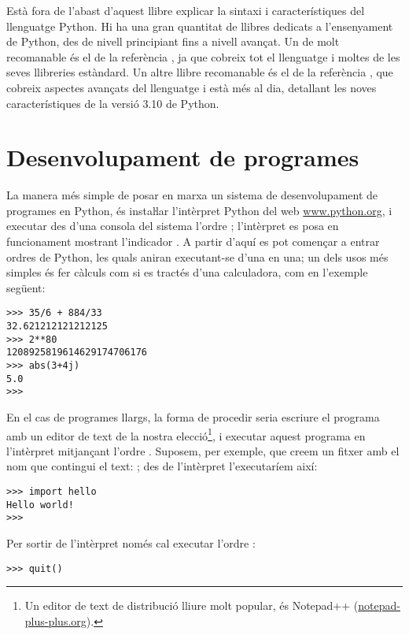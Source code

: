 Està fora de l'abast d'aquest llibre explicar la sintaxi i característiques del llenguatge Python. Hi ha una gran quantitat de llibres dedicats a l'ensenyament de Python, des de nivell principiant fins a nivell avançat. Un de molt recomanable és el de la referència \cite{SUM}, ja que cobreix tot el llenguatge i moltes de les seves llibreries estàndard. Un altre llibre recomanable és el de la referència \cite{RAM}, que cobreix aspectes avançats del llenguatge i està més al dia, detallant les noves característiques de la versió 3.10 de Python.


\section{Desenvolupament de programes}\label{sec:py-desenvel-prog}

La manera més simple de posar en marxa un sistema de desenvolupament de programes en Python, és instaŀlar l'intèrpret Python del web \href{https://www.python.org/}{www.python.org}, i executar des d'una consola del sistema l'ordre ;
l'intèrpret es posa en funcionament mostrant l'indicador \funsfbs{>{}>{}>}. A partir d'aquí es pot començar a entrar ordres de Python, les quals aniran executant-se d'una en una; un dels usos més simples és  fer càlculs com si es tractés d'una calculadora, com en l'exemple següent:
\begin{lstlisting}
>>> 35/6 + 884/33
32.621212121212125
>>> 2**80
1208925819614629174706176
>>> abs(3+4j)
5.0
>>>
\end{lstlisting}

En el cas de programes llargs, la forma de procedir seria escriure el programa amb un editor de text de la nostra elecció\footnote{Un editor de text de distribució lliure molt popular, és Notepad++ (\href{https://notepad-plus-plus.org/}{notepad-plus-plus.org}).}, i executar aquest programa en l'intèrpret mitjançant l'ordre . Suposem, per exemple, que creem un fitxer amb el nom  que contingui el text: ; des de l'intèrpret l'executaríem així:
\begin{lstlisting}
>>> import hello
Hello world!
>>>
\end{lstlisting}

Per sortir de l'intèrpret només cal executar l'ordre :
\begin{lstlisting}
>>> quit()
\end{lstlisting}


